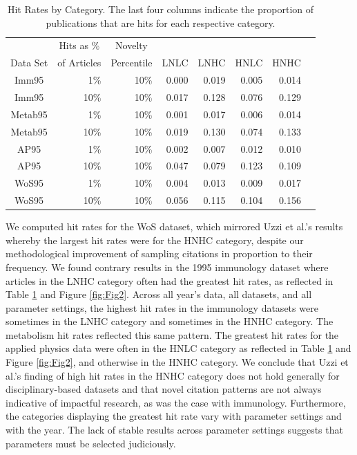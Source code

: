 \documentclass[NETN]{stjour}
\begin{document}
\begin{table}%
\centering
\caption[Hit Rates]{Hit Rates by Category. The last four columns indicate the proportion of publications that are hits for each respective category.} \label{Tab:HitRate}
\begin{tabular}{crrrrrrr}
& \multicolumn{1}{c}{Hits as \%} & \multicolumn{1}{c}{Novelty}  &  &  &  &  \\ Data Set & \multicolumn{1}{c}{of Articles} & \multicolumn{1}{c}{Percentile} & \multicolumn{1}{c}{LNLC} & \multicolumn{1}{c}{LNHC} & \multicolumn{1}{c}{HNLC} & \multicolumn{1}{c}{HNHC} \\ \hline
   
Imm95&1\%&10\%& 0.000& 0.019& 0.005& 0.014 \\ 
Imm95&10\%&10\%& 0.017& 0.128& 0.076& 0.129 \\ 
Metab95&1\%&10\%& 0.001& 0.017& 0.006& 0.014 \\ 
Metab95&10\%&10\%& 0.019& 0.130& 0.074& 0.133 \\ 
AP95&1\%&10\%& 0.002& 0.007& 0.012& 0.010 \\ 
AP95&10\%&10\%& 0.047& 0.079& 0.123& 0.109 \\ 
WoS95&1\%&10\%& 0.004& 0.013& 0.009& 0.017 \\ 
WoS95&10\%&10\%& 0.056& 0.115& 0.104& 0.156 \\ \hline

\end{tabular}
\end{table}


We computed hit rates for the WoS dataset, which mirrored Uzzi et al.'s results whereby the largest hit rates were for the HNHC category, despite our methodological improvement of sampling citations in proportion to their frequency. We found contrary results in the 1995 immunology dataset where articles in the LNHC category often had the greatest hit rates, as reflected in Table \ref{Tab:HitRate} and Figure \ref{fig:Fig2}.  Across all year's data, all datasets, and all parameter settings, the highest hit rates in the immunology datasets were sometimes in the LNHC category and sometimes in the HNHC category. The metabolism hit rates reflected this same pattern. The greatest hit rates for the applied physics data were often in the HNLC category as reflected in Table \ref{Tab:HitRate} and Figure \ref{fig:Fig2}, and otherwise in the HNHC category. We conclude that Uzzi et al.'s finding of high hit rates in the HNHC category does not hold generally for disciplinary-based datasets and that novel citation patterns are not always indicative of impactful research, as was the case with immunology. Furthermore, the categories displaying the greatest hit rate vary with parameter settings and with the year. The lack of stable results across parameter settings suggests that parameters must be selected judiciously.
\end{document}
